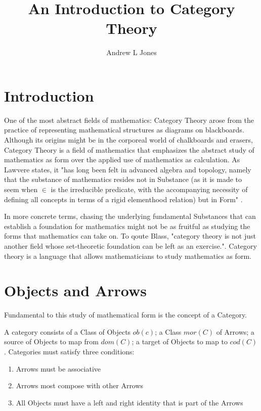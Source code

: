 \documentclass{article}
\title{An Introduction to Category Theory}
\author{Andrew L Jones}\date{}
\begin{document}
\maketitle


\section*{Introduction}
One of the most abstract fields of mathematics: Category Theory arose from the practice of representing mathematical structures as diagrams on blackboards. Although its origins might be in the corporeal world of chalkboards and erasers, Category Theory is a field of mathematics that emphasizes the abstract study of mathematics as form over the applied use of mathematics as calculation. As Lawvere states, it "has long been felt in advanced algebra and topology, namely that the substance of mathematics resides not in Substance (as it is made to seem when $\in$ is the irreducible predicate, with the accompanying necessity of defining all concepts in terms of a rigid elementhood relation) but in Form" \cite{Lawvere01}. 

In more concrete terms, chasing the underlying fundamental Substances that can establish a foundation for mathematics might not be as fruitful as studying the forms that mathematics can take on. To qoute Blass, "category theory is not just another field whose set-theoretic foundation can be left as an exercise."\cite{Blass01}. Category theory is a language that allows mathematicians to study mathematics as form.


\section{Objects and Arrows}
Fundamental to this study of mathematical form is the concept of a Category.
\begin{definition}
A category consists of a Class of Objects $ob(c)$; a Class $mor(C)$ of Arrows; a source of Objects to map from $dom(C)$; a target of Objects to map to $cod(C)$. Categories must satisfy three conditions: \begin{enumerate}
    \item Arrows must be associative
    \item Arrows most compose with other Arrows
    \item All Objects must have a left and right identity that is part of the Arrows
  \end{enumerate}
\end{definition}
\end{document}
